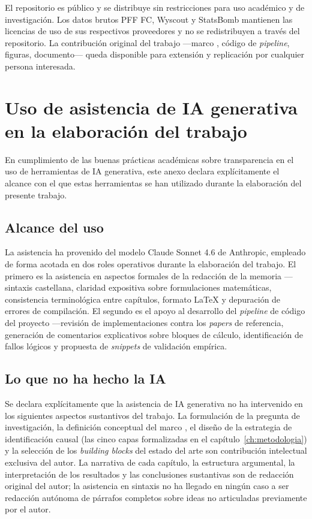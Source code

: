 El repositorio es público y se distribuye sin restricciones para uso
académico y de investigación. Los datos brutos PFF FC, Wyscout y
StatsBomb mantienen las licencias de uso de sus respectivos
proveedores y no se redistribuyen a través del repositorio. La
contribución original del trabajo ---marco \CCV, código de
\textit{pipeline}, figuras, documento--- queda disponible para
extensión y replicación por cualquier persona interesada.


\chapter{Uso de asistencia de IA generativa en la elaboración del trabajo}
\label{anexo:uso-ia}

En cumplimiento de las buenas prácticas académicas sobre transparencia
en el uso de herramientas de IA generativa, este anexo declara
explícitamente el alcance con el que estas herramientas se han
utilizado durante la elaboración del presente trabajo.

\section{Alcance del uso}
\label{anexo:uso-ia-alcance}

La asistencia ha provenido del modelo Claude Sonnet 4.6 de Anthropic,
empleado de forma acotada en dos roles operativos durante la
elaboración del trabajo. El primero es la asistencia en aspectos
formales de la redacción de la memoria ---sintaxis castellana, claridad
expositiva sobre formulaciones matemáticas, consistencia terminológica
entre capítulos, formato \LaTeX{} y depuración de errores de
compilación. El segundo es el apoyo al desarrollo del \textit{pipeline}
de código del proyecto ---revisión de implementaciones contra los
\textit{papers} de referencia, generación de comentarios explicativos
sobre bloques de cálculo, identificación de fallos lógicos y propuesta
de \textit{snippets} de validación empírica.

\section{Lo que no ha hecho la IA}
\label{anexo:uso-ia-noha}

Se declara explícitamente que la asistencia de IA generativa no ha
intervenido en los siguientes aspectos sustantivos del trabajo. La
formulación de la pregunta de investigación, la definición conceptual
del marco \CCV, el diseño de la estrategia de identificación causal
(las cinco capas formalizadas en el capítulo~\ref{ch:metodologia}) y
la selección de los \textit{building blocks} del estado del arte son
contribución intelectual exclusiva del autor. La narrativa de cada
capítulo, la estructura argumental, la interpretación de los
resultados y las conclusiones sustantivas son de redacción original
del autor; la asistencia en sintaxis no ha llegado en ningún caso a
ser redacción autónoma de párrafos completos sobre ideas no
articuladas previamente por el autor.
